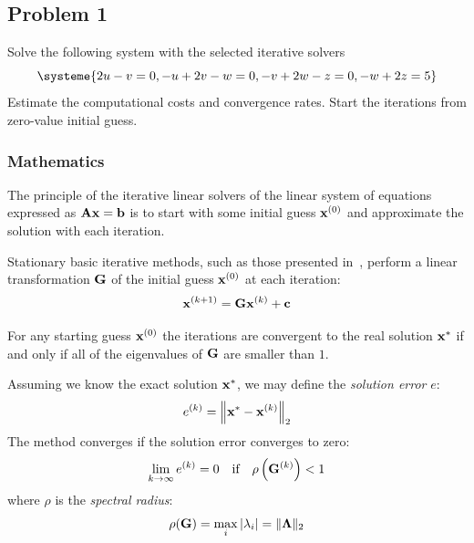 \subsection{Problem 1}%
\label{sec:problem_1}
Solve the following system with the selected iterative solvers
\begin{equation*}
  \systeme{2u-v=0,-u+2v-w=0,-v+2w-z=0,-w+2z=5}
\end{equation*}
Estimate the computational costs and convergence rates.
Start the iterations from zero-value initial guess.
\subsubsection*{Mathematics}
The principle of the iterative linear solvers of the linear system of equations
expressed as $\mathbf{A}\mathbf{x}=\mathbf{b}$ is to start with some initial guess
$\mathbf{x}^{(0)}$ and approximate the solution with each iteration.

Stationary basic iterative methods, such as those presented in~,
perform a linear transformation $\mathbf{G}$ of the initial guess $\mathbf{x}^{(0)}$ at each
iteration:
\begin{equation*}
  \mathbf{x}^{(k+1)} = \mathbf{G}\mathbf{x}^{(k)} + \mathbf{c}
\end{equation*}

For any starting guess $\mathbf{x}^{(0)}$ the iterations are convergent to the real
solution $\mathbf{x}^{*}$ if and only if all of the eigenvalues of $\mathbf{G}$ are smaller
than $1$.

Assuming we know the exact solution $\mathbf{x}^*$, we may define the
\textit{solution error} $e$:
\begin{equation*}
  e^{(k)} = {\left\lVert\mathbf{x}^{*}-\mathbf{x}^{(k)}\right\rVert}_2
\end{equation*}
The method converges if the solution error converges to zero:
\begin{equation}
  \label{eqn:convergence_criterion}
  \lim_{k\to\infty}{e^{(k)}} = 0
  \quad \text{if} \quad
  \rho\left(\mathbf{G}^{(k)}\right) < 1
\end{equation}
where $\rho$ is the \textit{spectral radius}:
\begin{equation*}
  \rho(\mathbf{G}) = \max_i{\lvert\lambda_i\rvert} = \lVert\mathbf{\Lambda}\rVert_2
\end{equation*}

